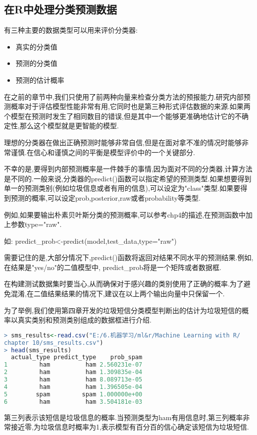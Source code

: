 \documentclass[11pt,a4paper,oneside]{book}
\begin{document}
\subsection{在R中处理分类预测数据}
有三种主要的数据类型可以用来评价分类器:
\begin{itemize}
	\item 真实的分类值
	\item 预测的分类值
	\item 预测的估计概率
\end{itemize}

在之前的章节中,我们只使用了前两种向量来检查分类方法的预报能力.研究内部预测概率对于评估模型性能非常有用,它同时也是第三种形式评估数据的来源.如果两个模型在预测时发生了相同数目的错误,但是其中一个能够更准确地估计它的不确定性,那么这个模型就是更智能的模型.

理想的分类器在做出正确预测时能够非常自信,但是在面对拿不准的情况时能够非常谨慎.在信心和谨慎之间的平衡是模型评价中的一个关键部分.

不幸的是,要得到内部预测概率是一件棘手的事情,因为面对不同的分类器,计算方法是不同的.一般来说,分类器的predict()函数可以指定希望的预测类型.如果想要得到单一的预测类别(例如垃圾信息或者有用的信息),可以设定为"class"类型.如果要得到预测的概率,可以设定prob,posterior,raw或者probability等类型.

\begin{tcolorbox}[colback=pink!10!white,colframe=pink!100!black]
例如,如果要输出朴素贝叶斯分类的预测概率,可以参考chp4的描述,在预测函数中加上参数type="raw".

如: predict\_prob<-predict(model,test\_data,type="raw")
\end{tcolorbox}

需要记住的是,大部分情况下,predict()函数将返回对结果不同水平的预测结果.例如,在结果是"yes/no"的二值模型中, predict\_prob将是一个矩阵或者数据框.

\begin{tcolorbox}[colback=pink!10!white,colframe=pink!100!black]
在构建测试数据集时要当心,从而确保对于感兴趣的类别使用了正确的概率.为了避免混淆,在二值结果结果的情况下,建议在以上两个输出向量中只保留一个.
\end{tcolorbox}

为了举例,我们使用第四章开发的垃圾短信分类模型判断出的估计为垃圾短信的概率以真实类别和预测类别组成的数据框进行介绍.

\begin{lstlisting}[language=r]
> sms_results<-read.csv("E:/6.机器学习/ml&r/Machine Learning with R/
chapter 10/sms_results.csv")
> head(sms_results)
  actual_type predict_type    prob_spam
1         ham          ham 2.560231e-07
2         ham          ham 1.309835e-04
3         ham          ham 8.089713e-05
4         ham          ham 1.396505e-04
5        spam         spam 1.000000e+00
6         ham          ham 3.504181e-03
\end{lstlisting}
第三列表示该短信是垃圾信息的概率.当预测类型为ham有用信息时,第三列概率非常接近零,为垃圾信息时概率为1,表示模型有百分百的信心确定该短信为垃圾短信.
\end{document}

